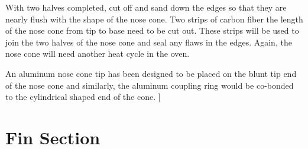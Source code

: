 \documentclass{aiaa-tc}%
\begin{document}
With two halves completed, cut off and sand down the edges so that they are nearly flush with the shape of the nose cone. Two strips of carbon fiber the length of the nose cone from tip to base need to be cut out. These strips will be used to join the two halves of the nose cone and seal any flaws in the edges. Again, the nose cone will need another heat cycle in the oven. 

An aluminum nose cone tip has been designed to be placed on the blunt tip end of the nose cone and similarly, the aluminum coupling ring would be co-bonded to the cylindrical shaped end of the cone. ]

\section{Fin Section}


\end{document}
